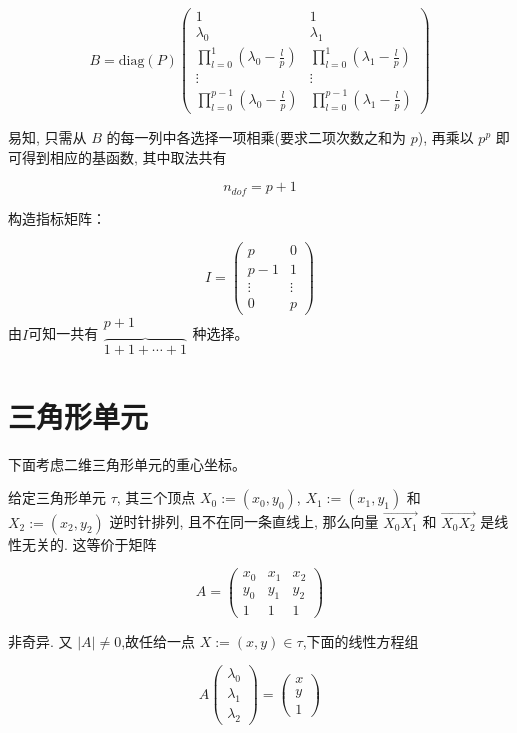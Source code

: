 \documentclass[12pt,a4paper]{article}
\begin{document}
$$
B = \mathrm{diag}(P)
\begin{pmatrix}
1 & 1\\
\lambda_0 & \lambda_1\\
\prod_{l=0}^{1}(\lambda_0 - \frac{l}{p}) & \prod_{l=0}^{1}(\lambda_1 - \frac{l}{p})\\
\vdots & \vdots \\
\prod_{l=0}^{p-1}(\lambda_0 - \frac{l}{p}) & \prod_{l=0}^{p-1}(\lambda_1 - \frac{l}{p}) 
\end{pmatrix}
$$

易知, 只需从 $B$ 的每一列中各选择一项相乘(要求二项次数之和为 $p$), 再乘以 $p^p$ 即可得到相应的基函数, 其中取法共有 

$$
n_{dof} = {p+1}
$$

构造指标矩阵：

$$
I = \begin{pmatrix}
p  & 0 \\ p-1 & 1 \\ \vdots & \vdots \\ 0 & p 
\end{pmatrix}
$$
由$I$可知一共有$\begin{matrix} p+1 \\ \overbrace{ 1+1+\cdots+1 }
\end{matrix}$种选择。

\section{三角形单元}
下面考虑二维三角形单元的重心坐标。

给定三角形单元 $\tau$, 其三个顶点 $X_0 :=(x_0,y_0)$, $X_1 :=(x_1,y_1)$ 和 $X_2 :=(x_2,y_2)$ 逆时针排列, 且不在同一条直线上, 那么向量 $\overrightarrow{X_0 X_1}$ 和 $\overrightarrow{X_0 X_2}$ 是线性无关的. 这等价于矩阵

$$
A = 
\begin{pmatrix}
x_0 & x_1 & x_2 \\
y_0 & y_1 & y_2 \\
1   & 1   & 1 
\end{pmatrix}
$$

非奇异. 
又 $|A|\ne 0$,故任给一点 $X:=(x,y)\in\tau$,下面的线性方程组

$$
A 
\begin{pmatrix}
\lambda_0 \\
\lambda_1\\
\lambda_2  
\end{pmatrix}
=\begin{pmatrix}
x \\
y\\
1  
\end{pmatrix}
$$
\end{document}
